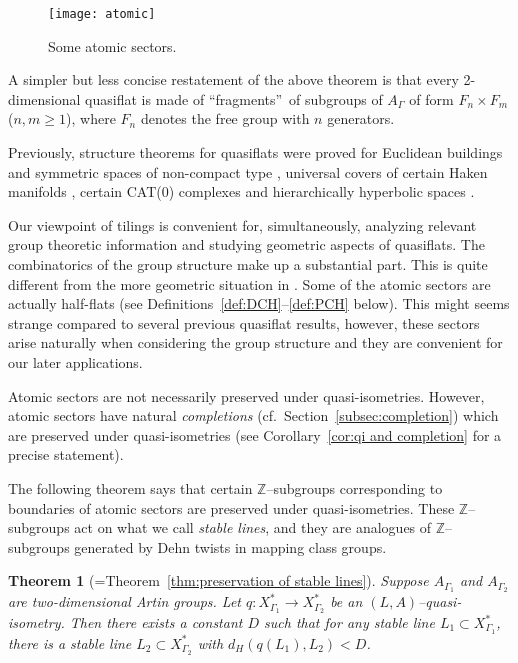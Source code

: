 \documentclass[11pt]{amsart}
\newtheorem{theorem}{Theorem}[section]
\theoremstyle{definition}
\newcommand{\Xa}{X^{\ast}}
\begin{document}
\begin{figure}[h!]
	\centering
	\texttt{[image: atomic]}
	\caption{Some atomic sectors.}
	\label{f:atomic}
\end{figure}

A simpler but less concise restatement of the above theorem is that every 2-dimensional quasiflat is made of \textquotedblleft fragments\textquotedblright\ of subgroups of $A_\Gamma$ of form $F_n\times F_m$ ($n,m\ge 1$), where $F_n$ denotes the free group with $n$ generators.

Previously, structure theorems for quasiflats were proved for Euclidean buildings and symmetric spaces of non-compact type \cite{kleiner1997rigidity,eskin1997quasi,wortman2006quasiflats}, universal covers of certain Haken manifolds \cite{kapovich1997quasi}, certain CAT(0) complexes \cite{bks,MR3654109} and hierarchically hyperbolic spaces \cite{behrstock2017quasiflats}.

Our viewpoint of tilings is convenient for, simultaneously, analyzing relevant group theoretic information and studying geometric aspects of quasiflats. The combinatorics of the group structure make up a substantial part. This is quite different from the more geometric situation in \cite{bks,MR3654109,behrstock2017quasiflats}. Some of the atomic sectors are actually half-flats (see Definitions~\ref{def:DCH}--\ref{def:PCH} below). This might seems strange compared to several previous quasiflat results, however, these sectors arise naturally when considering the group structure and they are convenient for our later applications.

Atomic sectors are not necessarily preserved under quasi-isometries. However, atomic sectors have natural \emph{completions} (cf.\ Section~\ref{subsec:completion}) which are preserved under quasi-isometries (see Corollary~\ref{cor:qi and completion} for a precise statement). 

The following theorem says that certain $\mathbb Z$--subgroups corresponding to boundaries of atomic sectors are preserved under quasi-isometries. These $\mathbb Z$--subgroups act on what we call \emph{stable lines}, and they are analogues of $\mathbb Z$--subgroups generated by Dehn twists in mapping class groups.

\begin{theorem}[=Theorem~\ref{thm:preservation of stable lines}]
	\label{thm:stable line}
	Suppose $A_{\Gamma_1}$ and $A_{\Gamma_2}$ are two-dimensional Artin groups. Let $q\colon\Xa_{\Gamma_1}\to \Xa_{\Gamma_2}$ be an $(L,A)$--quasi-isometry. Then there exists a constant $D$ such that for any stable line $L_1\subset \Xa_{\Gamma_1}$, there is a stable line $L_2\subset \Xa_{\Gamma_2}$ with $d_H(q(L_1),L_2)<D$.
\end{theorem}
\end{document}
